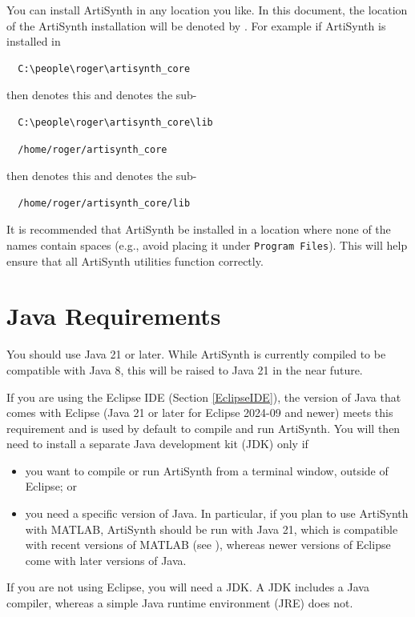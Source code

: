 You can install ArtiSynth in any location you like.
In this document, the location of the ArtiSynth installation \directory{}
will be denoted by \ArtHome[]. For example
if ArtiSynth is installed in
\ifWindows
\begin{verbatim}
  C:\people\roger\artisynth_core
\end{verbatim}
then \ArtHome[] denotes this \directory{}
and  denotes the sub-\directory{}
\begin{verbatim}
  C:\people\roger\artisynth_core\lib
\end{verbatim}
\else %
\begin{verbatim}
  /home/roger/artisynth_core
\end{verbatim}
then \ArtHome[] denotes this \directory{}
and  denotes the sub-\directory{}
\begin{verbatim}
  /home/roger/artisynth_core/lib
\end{verbatim}
\fi %

\ifLinux\else %
\begin{sideblock}
It is recommended that ArtiSynth be installed in a location where none of
the \directory{} names contain spaces (e.g., avoid placing it under
{\tt Program Files}).  This will help ensure that all ArtiSynth
utilities function correctly.
\end{sideblock}
\fi %

\section{Java Requirements}
\label{InstallingJava}

You should use Java 21 or later. While ArtiSynth is currently compiled
to be compatible with Java 8, this will be raised to Java 21 in the
near future.

If you are using the Eclipse IDE (Section \ref{EclipseIDE}), the
version of Java that comes with Eclipse (Java 21 or later for Eclipse
2024-09 and newer) meets this requirement and is used by default to
compile and run ArtiSynth. You will then need to install a separate
Java development kit (JDK) only if
\begin{itemize}

\item you want to compile or run ArtiSynth from a terminal window,
outside of Eclipse; or

\item you need a specific version of Java. In particular, if you plan
to use ArtiSynth with MATLAB, ArtiSynth should be run with Java 21,
which is compatible with recent versions of MATLAB (see
), whereas
newer versions of Eclipse come with later versions of Java.

\end{itemize}
If you are not using Eclipse, you will need a JDK.
A JDK includes a Java compiler, whereas a simple Java runtime
environment (JRE) does not.


